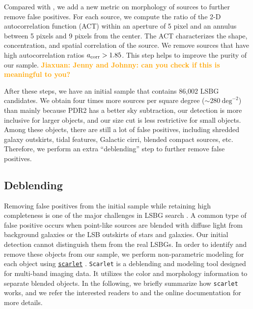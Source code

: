 \documentclass[twocolumn,astrosymb,twocolappendix]{aastex631}
\newcommand{\jiaxuan}[1]{\textcolor{orange}{\textbf{Jiaxuan: #1}}}
\newcommand{\code}[1]{\texttt{#1}}
\begin{document}
\begin{CJK*}{UTF8}{gbsn}
Compared with , we add a new metric on morphology of sources to further remove false positives. For each source, we compute the ratio of the 2-D autocorrelation function (ACT) within an aperture of 5 pixel and an annulus between 5 pixels and 9 pixels from the center. The ACT characterizes the shape, concentration, and spatial correlation of the source. We remove sources that have high autocorrelation ratios $a_{\rm corr} > 1.85$. This step helps to improve the purity of our sample. \jiaxuan{Jenny and Johnny: can you check if this is meaningful to you?} 

\vspace{2em}
After these steps, we have an initial sample that contains 86,002 LSBG candidates. We obtain four times more sources per square degree ($\sim 280\ \mathrm{deg}^{-2}$) than  mainly because PDR2 has a better sky subtraction,  our detection is more inclusive for larger objects, and our size cut is less restrictive for small objects. Among these objects, there are still a lot of false positives, including shredded galaxy outskirts, tidal features, Galactic cirri, blended compact sources, etc. Therefore, we perform an extra ``deblending'' step to further remove false positives.  

\subsection{Deblending}\label{sec:deblending}
Removing false positives from the initial sample while retaining high completeness is one of the major challenges in LSBG search \citep[e.g.,][]{vanDokkum2015,Koda2015,Yagi2016,Greco2018,SAGA-I,Zaritsky2019,Zaritsky2021,Tanoglidis2021,Zaritsky2022}. A common type of false positive occurs when point-like sources are blended with diffuse light from background galaxies or the LSB outskirts of stars and galaxies. Our initial detection cannot distinguish them from the real LSBGs. In order to identify and remove these objects from our sample, we perform non-parametric modeling for each object using \href{https://pmelchior.github.io/scarlet/}{\code{scarlet}} \citep{Melchior2018}. \code{Scarlet} is a deblending and modeling tool designed for multi-band imaging data. It utilizes the color and morphology information to separate blended objects. In the following, we briefly summarize how \code{scarlet} works, and we refer the interested readers to \citet{Melchior2018,Melchior2021} and the online documentation for more details. 


\end{CJK*}
\end{document}
